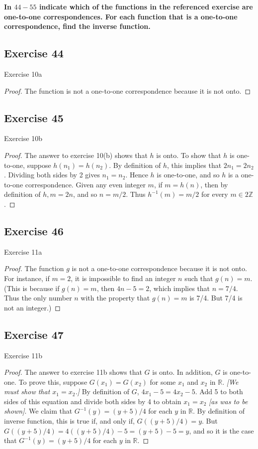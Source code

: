 \documentclass[14pt]{extarticle}
\newcommand{\R}{\mathbb{R}}
\newcommand{\Z}{\mathbb{Z}}
\newcommand{\cy}{\color{cyan}}
\begin{document}
{\bf \cy In $44-55$ indicate which of the functions in the referenced exercise are one-to-one correspondences. For 
each function that is a one-to-one correspondence, find the inverse function.}

\subsection{Exercise 44}
Exercise 10a
\begin{proof}
The function is not a one-to-one correspondence because it is not onto.
\end{proof}

\subsection{Exercise 45}
Exercise 10b
\begin{proof}
The answer to exercise 10(b) shows that $h$ is onto. To show that $h$ is one-to-one, suppose \(h(n_1) = h(n_2)\). 
By definition of $h$, this implies that \(2n_1 = 2n_2\). Dividing both sides by 2 gives \(n_1 = n_2\). Hence $h$ is 
one-to-one, and so $h$ is a one-to-one correspondence. Given any even integer $m$, if \(m = h(n)\), then by 
definition of \(h, m = 2n\), and so \(n = m/2\). Thus \(h^{-1}(m) = m/2\) for every \(m \in 2\Z\).
\end{proof}

\subsection{Exercise 46}
Exercise 11a
\begin{proof}
The function $g$ is not a one-to-one correspondence because it is not onto. For instance, if $m = 2$, it is impossible 
to find an integer $n$ such that \(g(n) = m\). (This is because if \(g(n) = m\), then \(4n - 5 = 2\), which implies 
that \(n = 7/4\). Thus the only number $n$ with the property that \(g(n) = m\) is 7/4. But 7/4 is not an integer.)
\end{proof}

\subsection{Exercise 47}
Exercise 11b
\begin{proof}
The answer to exercise 11b shows that $G$ is onto. In addition, $G$ is one-to-one. To prove this, suppose 
\(G(x_1) = G(x_2)\) for some $x_1$ and $x_2$ in $\R$. {\it [We must show that \(x_1 = x_2\).]} By definition of $G$, 
\(4x_1 - 5 = 4x_2 - 5\). Add 5 to both sides of this equation and divide both sides by 4 to obtain \(x_1 = x_2\) 
{\it [as was to be shown]}. We claim that \(G^{-1}(y) = (y + 5)/4\) for each $y$ in $\R$. By definition of inverse 
function, this is true if, and only if, \(G((y + 5)/4) = y\). But \(G((y+5)/4) = 4((y + 5)/4)-5=(y + 5) - 5 = y\), 
and so it is the case that \(G^{-1}(y) = (y + 5)/4\) for each $y$ in $\R$.
\end{proof}
\end{document}
